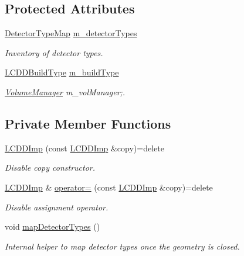 \subsection*{Protected Attributes}
\begin{DoxyCompactItemize}
\item 
\hyperlink{class_d_d4hep_1_1_geometry_1_1_l_c_d_d_imp_af80f7fef6780569e2368b4c65bba3f58}{Detector\+Type\+Map} \hyperlink{class_d_d4hep_1_1_geometry_1_1_l_c_d_d_imp_ae90ce0f851d3887bb833a42fa34c6aea}{m\+\_\+detector\+Types}
\begin{DoxyCompactList}\small\item\em Inventory of detector types. \end{DoxyCompactList}\item 
\hyperlink{namespace_d_d4hep_acafe43ba4537ab6e999e808142965fab}{L\+C\+D\+D\+Build\+Type} \hyperlink{class_d_d4hep_1_1_geometry_1_1_l_c_d_d_imp_a5cd51ba18f6d2e7723acc93d9b7a90e4}{m\+\_\+build\+Type}
\begin{DoxyCompactList}\small\item\em \hyperlink{class_d_d4hep_1_1_geometry_1_1_volume_manager}{Volume\+Manager} m\+\_\+vol\+Manager;. \end{DoxyCompactList}\end{DoxyCompactItemize}
\subsection*{Private Member Functions}
\begin{DoxyCompactItemize}
\item 
\hyperlink{class_d_d4hep_1_1_geometry_1_1_l_c_d_d_imp_ae7964335abcf478a0313d4974cddef69}{L\+C\+D\+D\+Imp} (const \hyperlink{class_d_d4hep_1_1_geometry_1_1_l_c_d_d_imp}{L\+C\+D\+D\+Imp} \&copy)=delete
\begin{DoxyCompactList}\small\item\em Disable copy constructor. \end{DoxyCompactList}\item 
\hyperlink{class_d_d4hep_1_1_geometry_1_1_l_c_d_d_imp}{L\+C\+D\+D\+Imp} \& \hyperlink{class_d_d4hep_1_1_geometry_1_1_l_c_d_d_imp_a00cebfdd9c062291453952301fbcc671}{operator=} (const \hyperlink{class_d_d4hep_1_1_geometry_1_1_l_c_d_d_imp}{L\+C\+D\+D\+Imp} \&copy)=delete
\begin{DoxyCompactList}\small\item\em Disable assignment operator. \end{DoxyCompactList}\item 
void \hyperlink{class_d_d4hep_1_1_geometry_1_1_l_c_d_d_imp_ade5422f804607ee686022a4a05bd3cff}{map\+Detector\+Types} ()
\begin{DoxyCompactList}\small\item\em Internal helper to map detector types once the geometry is closed. \end{DoxyCompactList}\end{DoxyCompactItemize}
